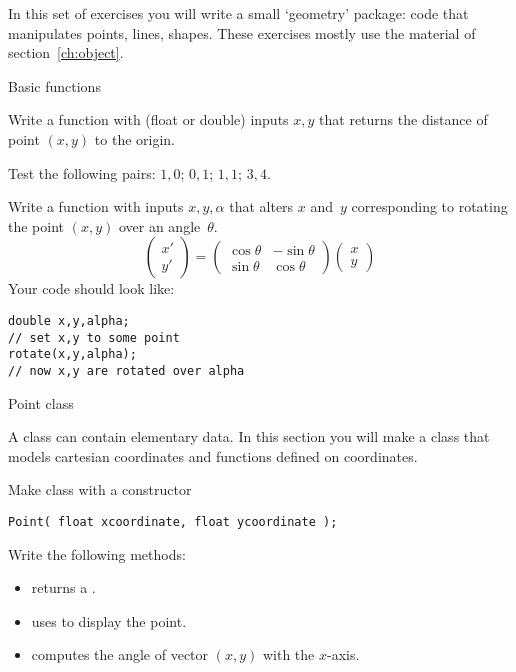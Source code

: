 
In this set of exercises you will write a small `geometry' package:
code that manipulates points, lines, shapes.
These exercises mostly use the material of section~\ref{ch:object}.

 {Basic functions}
\label{sec:geom-basic}

\begin{exercise}
  \label{ex:func-pointdistance}
  Write a function with (float or double) inputs $x,y$ that returns the distance of
  point $(x,y)$ to the origin.

  Test the following pairs: $1,0$; $0,1$; $1,1$; $3,4$.
\end{exercise}

\begin{exercise}
  \label{ex:pointrotate}
  Write a function with inputs $x,y,\alpha$ that alters $x$ and~$y$
  corresponding to rotating the point $(x,y)$ over an angle~$\theta$.
  \[
  \begin{pmatrix}
    x'\\y'
  \end{pmatrix} =
  \begin{pmatrix}
    \cos\theta& -\sin\theta\\ \sin\theta&\cos\theta
  \end{pmatrix}
  \begin{pmatrix}
    x\\y
  \end{pmatrix}
  \]
  Your code should look like:
\begin{verbatim}
double x,y,alpha;
// set x,y to some point
rotate(x,y,alpha);
// now x,y are rotated over alpha
\end{verbatim}
\end{exercise}

 {Point class}
\label{ex:pointfunc}

\prerequisite{\ref{sec:object}}

A class can contain elementary data. In this section you will make a
 class that models cartesian coordinates and functions
defined on coordinates.

\begin{exercise}
  \label{ex:geom:point}
  Make class  with a constructor
\begin{verbatim}
Point( float xcoordinate, float ycoordinate );
\end{verbatim}
Write the following methods:
\begin{itemize}
\item {} returns a .
\item  {} uses  to display the point.
\item {} computes the angle of vector $(x,y)$ with the $x$-axis.
\end{itemize}
\end{exercise}

